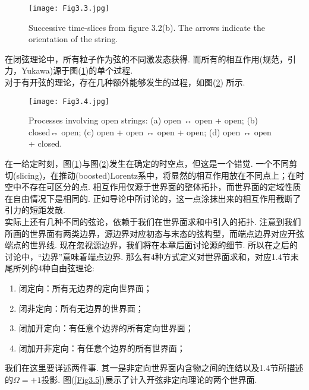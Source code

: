 \begin{figure}
	\begin{center}
		\texttt{[image: Fig3.3.jpg]}\\
\caption{Successive time-slices from figure 3.2(b). The arrows indicate the orientation of the string.}\label{Fig3.3}
	\end{center}
\end{figure}
在闭弦理论中，所有粒子作为弦的不同激发态获得. 而所有的相互作用(规范，引力，Yukawa)源于图(\ref{Fig3.3})的单个过程.\\
对于有开弦的理论，存在几种额外能够发生的过程，如图(\ref{Fig3.4}) 所示.\\
\begin{figure}
	\begin{center}
		\texttt{[image: Fig3.4.jpg]}\\
\caption{Processes involving open strings: (a) open ↔ open + open; (b) closed↔ open; (c) open + open ↔ open + open; (d) open ↔ open + closed.}\label{Fig3.4}
	\end{center}
\end{figure}
在一给定时刻，图(\ref{Fig3.3})与图(\ref{Fig3.4})发生在确定的时空点，但这是一个错觉. 一个不同剪切(slicing)，在推动(boosted)Lorentz系中，将显然的相互作用放在不同点上；在时空中不存在可区分的点. 相互作用仅源于世界面的整体拓扑，而世界面的定域性质在自由情况下是相同的. 正如导论中所讨论的，这一点涂抹出来的相互作用截断了引力的短距发散. \\
实际上还有几种不同的弦论，依赖于我们在世界面求和中引入的拓扑. 注意到我们所画的世界面有两类边界，源边界对应初态与末态的弦构型，而端点边界对应开弦端点的世界线. 现在忽视源边界，我们将在本章后面讨论源的细节. 所以在之后的讨论中，“边界”意味着端点边界. 那么有4种方式定义对世界面求和，对应1.4节末尾所列的4种自由弦理论:
\begin{enumerate}
	\item 闭定向：所有无边界的定向世界面；
	\item 闭非定向：所有无边界的世界面；
	\item 闭加开定向：有任意个边界的所有定向世界面；
	\item 闭加开非定向：有任意个边界的所有世界面；
\end{enumerate} 
我们在这里要详述两件事. 其一是非定向世界面内含物之间的连结以及1.4节所描述的$\Omega=+1$投影. 图(\ref{Fig3.5})展示了计入开弦非定向理论的两个世界面.\\
